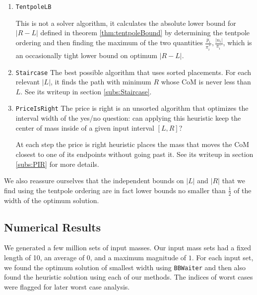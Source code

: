 \begin{enumerate}
\item \texttt{TentpoleLB}

This is not a solver algorithm, it calculates the absolute lower bound for $|R-L|$ defined in theorem \ref{thm:tentpoleBound} by determining the tentpole ordering and then finding the maximum of the two quantities $\frac{p_i}{\pi^+_i},\frac{|n_i|}{\pi^-_i}$, which is an occasionally tight lower bound on optimum $|R-L|$.

\item \texttt{Staircase} The best possible algorithm that uses sorted placements. For each relevant $|L|$, it finds the path with minimum $R$ whose CoM is never less than $L$.   See its writeup in section \ref{subs:Staircase}.

\item \texttt{PriceIsRight}
The price is right is an unsorted algorithm that optimizes the interval width of the yes/no question: can applying this heuristic keep the center of mass inside of a given input interval $[L,R]$?

At each step the price is right heuristic places the mass that moves the CoM closest to one of its endpoints without going past it.  See its writeup in section \ref{subs:PIR} for more details.

\end{enumerate}

We also reassure ourselves that the independent bounds on $|L|$ and $|R|$ that we find using the tentpole ordering are in fact lower bounds no smaller than $\frac12$ of the width of the optimum solution.

\subsection{Numerical Results}

We generated a few million sets of input masses.  Our input mass sets had a fixed length of 10, an average of 0, and a maximum magnitude of $1$.  For each input set, we found the optimum solution of smallest width using \texttt{BBWaiter} and then also found the heuristic solution using each of our methods.  The indices of worst cases were flagged for later worst case analysis. 


